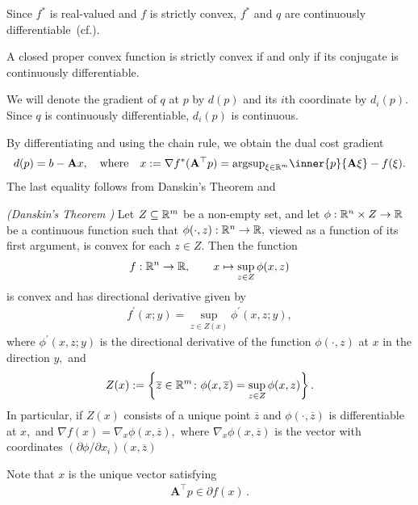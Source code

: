Since $f^*$ is real-valued and $f$ is strictly convex, 
$f^*$ and $q$ are continuously differentiable~(cf.\cite[Theorem~26.3]{Rockafellar1970}).
\begin{theorem*}
  \emph{}
  A closed proper convex function is strictly convex
  if and only if its conjugate is continuously differentiable.
\end{theorem*}

We will denote the gradient of $q$ at $p$ by $d(p)$
and its $i$th coordinate by $d_i(p).$
Since $q$ is continuously differentiable, $d_i(p)$ is continuous.

By differentiating and using the chain rule, 
we obtain the dual cost gradient
\begin{gather}
  \label{cv:ts:1}
  d(p)=b-\mathbf{A}x,
  \quad
  \text{where}
  \quad
  x:=
  \nabla
  f^*
  (
    \mathbf{A}^\top
    p
  )
  =
  \mathrm{argsup}
  _{\xi \in \R^m}
  \inner{p}{\mathbf{A}\xi}
  - f(\xi)
  .
\end{gather}
The last equality follows from Danskin's Theorem and \cite[Theorem~23.5]{Rockafellar1970}


\begin{proposition*}
  \emph{(Danskin's Theorem \cite[page 649]{Bertsekas2003})}
  Let 
  $
    Z \subseteq \mathbb{R}^m
  $
  be a non-empty set, 
  and let 
  $
    \phi :
    \mathbb{R}^n \times Z \to \mathbb{R}
  $
  be a continuous function such that
  $
    \phi(\cdot,z)
    :
    \mathbb{R}^n \to \mathbb{R},
  $
  viewed as a function of its first argument, 
  is convex for each 
  $
    z \in Z.
  $
  Then the function 
  \begin{gather}
    f:\mathbb{R}^n \to \mathbb{R}
    ,
    \qquad
    x\mapsto
    \sup_{z\in Z}
    \phi(x,z)
  \end{gather}
  is convex and has directional derivative given by
  \begin{gather}
    f^{'}(x;y)
    =
    \sup_{z \in Z(x)}
    \phi^{'}(x,z; y)
    ,
  \end{gather}
  where 
  $
    \phi^{'}(x,z; y)
  $
  is the directional derivative of the function 
  $
    \phi(\cdot,z)
  $
  at
  $x$ in the direction $y,$
  and
  \begin{gather}
    Z(x)
    :=
    \left\{ 
      \overline{z} \in \mathbb{R}^m
      \colon
      \phi(x, \overline{z})
      =
    \sup_{z\in Z}
    \phi(x,z)
  \right\}
  .
  \end{gather}
  In particular, if $Z(x)$ consists of a unique point 
  $\overline{z}$
  and
  $
    \phi(\cdot, \overline{z})
  $
  is differentiable at $x,$
  and 
  $
    \nabla f(x)
    =
    \nabla_x
    \phi(x,\overline{z})
    ,
  $
  where 
  $
    \nabla_x
    \phi(x,\overline{z})
  $
  is the vector with coordinates
  $
    (\partial \phi / \partial x_i)
    (x,\overline{z})
  $
\end{proposition*}
Note that $x$ is the unique vector satisfying 
\begin{gather}
  \mathbf{A}^\top p
  \in 
  \partial
  f(x)
  \,.
\end{gather}

